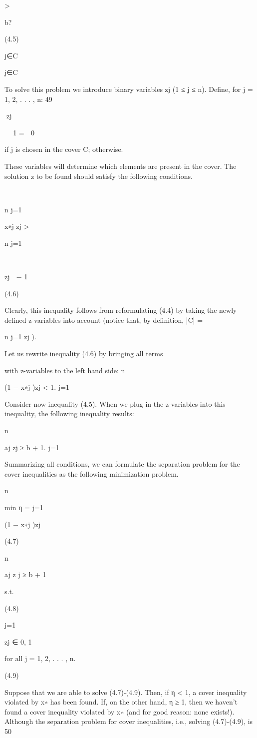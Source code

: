 \documentclass[titlepage]{book}
\theoremstyle{plain}
\theoremstyle{definition}
\theoremstyle{remark}
\begin{document}
>

b?

(4.5)

j∈C

j∈C

To solve this problem we introduce binary variables zj (1 ≤ j ≤ n). Define, for j = 1, 2, . . . , n:
49

zj


 1
=
 0

if j is chosen in the cover C;
otherwise.

These variables will determine which elements are present in the cover. The solution z to be found should
satisfy the following conditions.



n
j=1

x∗j zj > 

n
j=1



zj  − 1

(4.6)

Clearly, this inequality follows from reformulating (4.4) by taking the newly defined z-variables into
account (notice that, by definition, |C| =

n
j=1 zj ).

Let us rewrite inequality (4.6) by bringing all terms

with z-variables to the left hand side:
n

(1 − x∗j )zj < 1.
j=1

Consider now inequality (4.5). When we plug in the z-variables into this inequality, the following inequality results:

n

aj zj ≥ b + 1.
j=1

Summarizing all conditions, we can formulate the separation problem for the cover inequalities as the
following minimization problem.

n

min η =
j=1

(1 − x∗j )zj

(4.7)

n

aj z j ≥ b + 1

s.t.

(4.8)

j=1

zj ∈ {0, 1}

for all j = 1, 2, . . . , n.

(4.9)

Suppose that we are able to solve (4.7)-(4.9). Then, if η < 1, a cover inequality violated by x∗ has been
found. If, on the other hand, η ≥ 1, then we haven't found a cover inequality violated by x∗ (and for good
reason: none exists!). Although the separation problem for cover inequalities, i.e., solving (4.7)-(4.9), is
50
\end{document}
